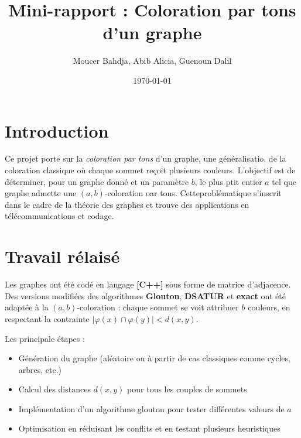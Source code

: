 \documentclass[a4paper,11pt]{article}
\title{\textbf{Mini-rapport : Coloration par tons d'un graphe}}
\author{Moucer Bahdja, Abib Alicia, Guenoun Dalil}
\date{\today}
\begin{document}
\maketitle

\section*{Introduction}
Ce projet porte sur la \textit{coloration par tons} d'un graphe, une généralisatio, de la coloration classique
où chaque sommet reçoit plusieurs couleurs. L'objectif est de déterminer, pour un graphe donné
et un paramètre $b$, le plus ptit entier $a$ tel que graphe admette une $(a,b)$-coloration oar tons.
Cetteproblématique s'inscrit dans le cadre de la théorie des graphes et trouve des applications en télécommunications
et codage.

\section*{Travail rélaisé}
Les graphes ont été codé en langage \textbf{[C++]} sous forme de matrice d'adjacence.
Des versions modifiées des algorithmes \textbf{Glouton}, \textbf{DSATUR} et \textbf{exact} ont été adaptée à la $(a,b)$-coloration : 
chaque sommet se voit attribuer $b$ couleurs, en respectant la contrainte $|\varphi(x) \cap \varphi(y)| < d(x, y)$.

\medskip
Les principale étapes : 
\begin{itemize}
    \item Génération du graphe (aléatoire ou à partir de cas classiques comme cycles, arbres, etc.)
    \item Calcul des distances $d(x,y)$ pour tous les couples de sommets
    \item Implémentation d’un algorithme glouton pour tester différentes valeurs de $a$
    \item Optimisation en réduisant les conflits et en testant plusieurs heuristiques
\end{itemize}
\end{document}
